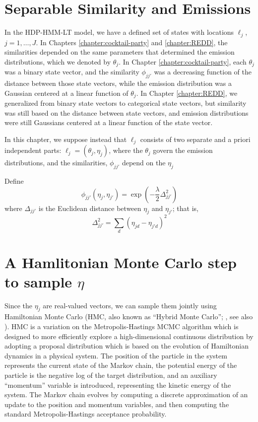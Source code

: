 \section{Separable Similarity and Emissions}
\label{sec:separ-simil-emiss}

In the HDP-HMM-LT model, we have a defined set of states with 
locations $\ell_j$, $j = 1, \dots,
J$.  In Chapters \ref{chapter:cocktail-party} and \ref{chapter:REDD}, the similarities depended on the same parameters that determined the emission distributions, which we denoted by $\theta_j$.  In Chapter \ref{chapter:cocktail-party},
each $\theta_j$ was a binary state vector, and the similarity $\phi_{jj'}$ was a decreasing function of the distance between those state vectors, while the emission distribution was a Gaussian centered at a linear function of $\theta_j$.  In Chapter \ref{chapter:REDD}, we generalized from binary state vectors to categorical state vectors, but similarity was still based on the distance between state vectors, and emission distributions were still Gaussians centered at a linear function of the state vector.

In this chapter, we suppose instead that $\ell_{j}$ consists of two separate and a priori independent parts: $\ell_j = (\theta_{j}, \eta_{j})$, where the $\theta_j$ govern the emission distributions, and the similarities, $\phi_{jj'}$ depend on the $\eta_j$

Define
\begin{equation*}
  \phi_{jj'}(\eta_j, \eta_{j'}) = \exp\left(-\frac{\lambda}{2} \Delta_{jj'}^2\right)
\end{equation*}
where $\Delta_{jj'}$ is the Euclidean distance between $\eta_j$ and
$\eta_{j'}$; that is,
\begin{equation*}
  \Delta_{jj'}^2 = \sum_{d} (\eta_{jd} - \eta_{j'd})^2
\end{equation*}

\section{A Hamlitonian Monte Carlo step to sample $\eta$}
\label{sec:haml-monte-carlo}

Since the $\eta_j$ are real-valued vectors, we can sample them jointly using Hamiltonian Monte Carlo (HMC, also known as ``Hybrid Monte Carlo''; \citet{duane1987hybrid}, see also \citet{neal2011mcmc}).  HMC is a variation on the Metropolis-Hastings MCMC 
algorithm which is designed to more efficiently explore a high-dimensional continuous distribution by adopting a proposal distribution which is based on the evolution of Hamiltonian dynamics in a physical system.  The position of the particle in the system represents the current state of the Markov chain, the potential energy of the particle is the negative log of the target distribution, and an auxiliary ``momentum'' variable is introduced, representing the kinetic energy of the system.  The Markov chain evolves by computing a discrete approximation of an update to the position and momentum variables, and then computing the standard Metropolis-Hastings acceptance probability.

